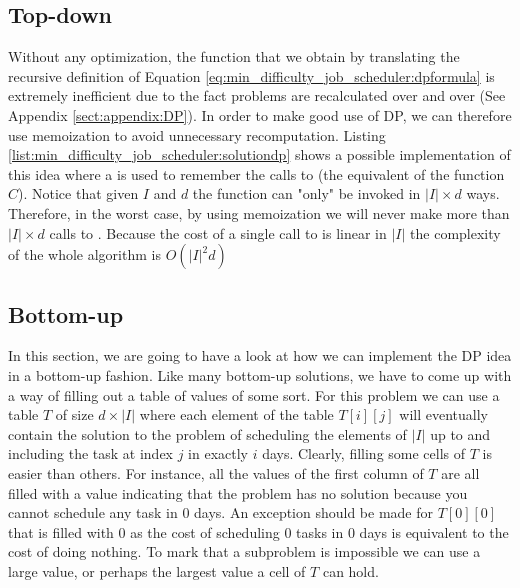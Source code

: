 \subsection{Top-down}
Without any optimization, the function that we obtain by translating the recursive definition of
Equation \ref{eq:min_difficulty_job_scheduler:dpformula} is extremely inefficient due to the fact
problems are recalculated over and over (See Appendix \ref{sect:appendix:DP}). In order to make good
use of DP, we can therefore use memoization to avoid unnecessary recomputation. Listing
\ref{list:min_difficulty_job_scheduler:solutiondp} shows a possible implementation of this idea
where a  is used to remember the calls to 
(the equivalent of the function $C$). Notice that given $I$ and $d$ the function can "only"  be
invoked in $|I| \times d$ ways. Therefore, in the worst case, by using memoization we will never
make more than $|I| \times d$ calls to . Because the cost of a single
call to  is linear in $|I|$ the complexity of the whole algorithm is
$O(|I|^2 d)$



\subsection{Bottom-up}
In this section, we are going to have a look at how we can implement the DP idea in a bottom-up
fashion. Like many bottom-up solutions, we have to come up with a way of filling out a table of
values of some sort. For this problem we can use a table $T$ of size $d \times |I|$  where each
element of the table $T[i][j]$ will eventually contain the solution to the problem of scheduling the
elements of $|I|$ up to and including the task at index $j$ in exactly $i$ days. Clearly, filling
some cells of  $T$ is easier than others. For instance, all the values of the first column of $T$
are all filled with a value indicating that the problem has no solution because you cannot schedule
any task in $0$ days. An exception should be made for $T[0][0]$ that is filled with $0$ as the cost
of scheduling $0$ tasks in $0$ days is equivalent to the cost of doing nothing. To mark that a
subproblem is impossible we can use a large value, or perhaps the largest value a cell of $T$ can
hold. 

